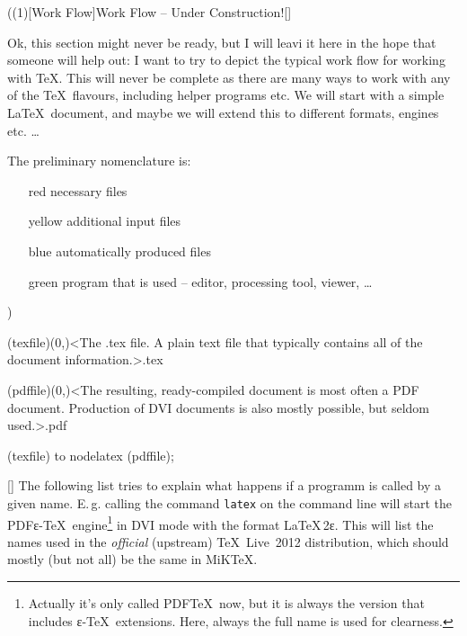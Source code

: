 \newpage
\tograph(\tostruct(1)[Work Flow]{Work Flow – Under Construction!}[\vip]
{
\flushleft
\large Ok, this section might never be ready, but I will leavi it here in the hope that someone will help out: I want to try to depict the typical work flow for working with \TeX. This will never be complete as there are many ways to work with any of the \TeX\ flavours, including helper programs etc. We will start with a simple \LaTeX\ document, and maybe we will extend this to different formats, engines etc. …

The preliminary nomenclature is:
\begin{itemize}
\item[red] necessary files
\item[yellow] additional input files
\item[blue] automatically produced files
\item[green] program that is used – editor, processing tool, viewer, …
\end{itemize}

\let\necessary\vip
\let\additional\experimental
\let\automatic\normalimportant
\let\program\package
}
){
	\tonode(texfile)(0,\layer)<The .tex file. A plain text file that typically contains all of the document information.>{.tex}
	\steplayer[-5]

	\tonode(pdffile)(0,\layer)<The resulting, ready-compiled document is most often a PDF document. Production of DVI documents is also mostly possible, but seldom used.>{.pdf}

	(texfile) to node{latex} (pdffile);
}

\label{sec:text}

\large
{}

\settextviews  %
\onecolumn

[\normalimportant]
\flushleft  %
The following list tries to explain what happens if a programm is called by a given name. E.\,g. calling the command \texttt{latex} on the command line will start the PDFε-\TeX\ engine\footnote{Actually it's only called PDF\TeX\ now, but it is always the version that includes ε-\TeX\ extensions. Here, always the full name is used for clearness.} in DVI mode with the format \LaTeX\,2\raisebox{-.5ex}ε. This will list the names used in the \emph{official} (upstream) \TeX~Live~2012 distribution, which should mostly (but not all) be the same in MiK\TeX.

